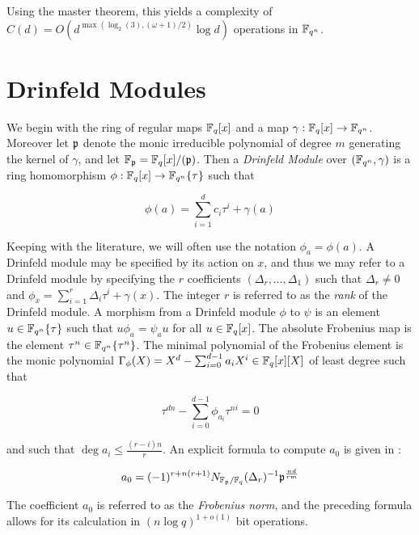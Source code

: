 Using the master theorem, this yields a complexity of $C(d) = O(d^{\max(\log_2(3), (\omega + 1)/2)}\log d)$ operations in $\mathbb{F}_{q^n}$.



\section{Drinfeld Modules}

We begin with the ring of regular maps $\mathbb{F}_q[x]$ and a map $\gamma : \mathbb{F}_q[x] \to \mathbb{F}_{q^n}$. Moreover let $\mathfrak{p}$ denote the monic irreducible polynomial of degree $m$ generating the kernel of $\gamma$, and let $\mathbb{F}_{\mathfrak{p}} = \mathbb{F}_q[x]/(\mathfrak{p})$. Then a \textit{Drinfeld Module} over $(\mathbb{F}_{q^n}, \gamma)$ is a ring homomorphism $\phi: \mathbb{F}_q[x] \to \mathbb{F}_{q^n}\{\tau \}$ such that

\begin{equation*}
    \phi(a) = \sum_{i=1}^{d}c_i\tau^i + \gamma(a)
\end{equation*}

Keeping with the literature, we will often use the notation $\phi_a = \phi(a)$. A Drinfeld module may be specified by its action on $x$, and thus we may refer to a Drinfeld module by specifying the $r$ coefficients $(\Delta_r, \ldots, \Delta_1)$ such that $\Delta_r \neq 0$ and $\phi_x = \sum_{i=1}^{r}\Delta_i \tau^i + \gamma(x)$. The integer $r$ is referred to as the \textit{rank} of the Drinfeld module. A morphism from a Drinfeld module $\phi$ to $\psi$ is an element $u \in \mathbb{F}_{q^n}\{ \tau\}$  such that $u \phi_a = \psi_a u$ for all $u \in \mathbb{F}_q[x]$. The absolute Frobenius map is the element $\tau^n \in \mathbb{F}_{q^n}\{ \tau^n \}$. The minimal polynomial of the Frobenius element is the monic polynomial $\Gamma_{\phi}(X) = X^d - \sum_{i=0}^{d-1} a_iX^i \in \mathbb{F}_q[x][X]$ of least degree such that 

\begin{equation*}
    \tau^{dn} - \sum_{i=0}^{d-1}\phi_{a_i} \tau^{ni} = 0
\end{equation*}

and such that $\deg a_i \leq \frac{(r - i)n}{r}$. An explicit formula to compute $a_0$ is given in \cite{GaPa18}:

\begin{equation}\label{norm}
    a_0 = (-1)^{r + n(r+1)}N_{\mathbb{F}_{\mathfrak{p}}/\mathbb{F}_q}(\Delta_r)^{-1} \mathfrak{p}^{ \frac{n d}{ r m}}
\end{equation}

The coefficient $a_0$ is referred to as the \textit{Frobenius norm}, and the preceding formula allows for its calculation in $(n\log q)^{1+o(1)}$ bit operations. 

